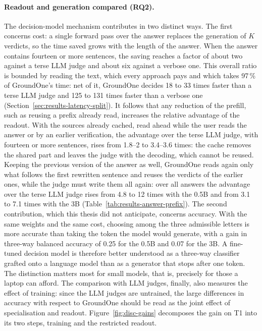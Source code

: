 \paragraph{Readout and generation compared (RQ2).} The decision-model mechanism contributes in two distinct ways. The
first concerns cost: a single forward pass over the answer replaces the generation of $K$ verdicts, so the time saved
grows with the length of the answer. When the answer contains fourteen or more sentences, the saving reaches a factor of
about two against a terse LLM judge and about six against a verbose one. This overall ratio is bounded by reading the text, which every approach pays and which takes 97\,\% of GroundOne's time: net of it, GroundOne decides 18 to 33 times faster than a terse LLM judge and 125 to 131 times faster than a verbose one (Section~\ref{sec:results-latency-split}). It follows that any reduction of the prefill, such as reusing a prefix already read, increases the relative advantage of the readout. With the sources already cached, read ahead while the user reads the answer or by an earlier verification, the advantage over the terse LLM judge, with fourteen or more sentences, rises from 1.8--2 to 3.4--3.6 times: the cache removes the shared part and leaves the judge with the decoding, which cannot be reused. Keeping the previous version of the answer as well, GroundOne reads again only what follows the first rewritten sentence and reuses the verdicts of the earlier ones, while the judge must write them all again: over all answers the advantage over the terse LLM judge rises from 4.8 to 12 times with the 0.5B and from 3.1 to 7.1 times with the 3B (Table~\ref{tab:results-answer-prefix}).
The second contribution, which this thesis did not
anticipate, concerns accuracy. With the same weights and the same cost, choosing among the three admissible letters is
more accurate than taking the token the model would generate, with a gain in three-way balanced accuracy of 0.25 for the
0.5B and 0.07 for the 3B. A fine-tuned decision model is therefore better understood as a three-way classifier grafted
onto a language model than as a generator that stops after one token. The distinction matters most for small models,
that is, precisely for those a laptop can afford. The comparison with LLM judges, finally, also measures the
effect of training: since the LLM judges are untrained, the large differences in accuracy with respect to GroundOne should be
read as the joint effect of specialisation and readout. Figure~\ref{fig:disc-gains} decomposes the gain on T1 into its
two steps, training and the restricted readout.

